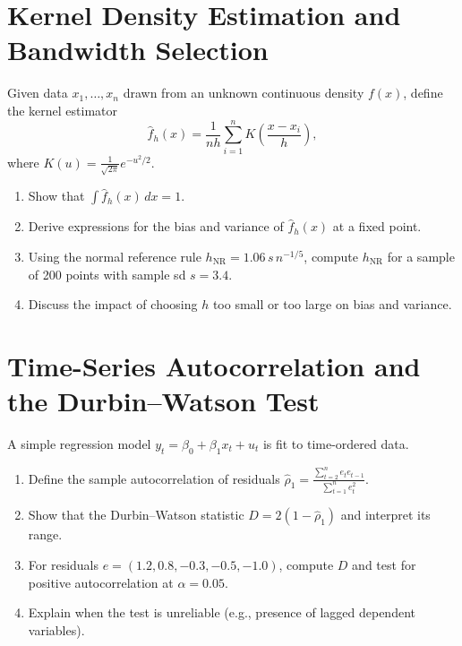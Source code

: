 \documentclass[12pt,a4paper]{article}
\begin{document}
\section{Kernel Density Estimation and Bandwidth Selection}
Given data \( x_1,\ldots,x_n \) drawn from an unknown continuous density \( f(x) \), define the kernel estimator
\[
\hat{f}_h(x) = \frac{1}{nh} \sum_{i=1}^n K\!\left(\frac{x-x_i}{h}\right),
\]
where \( K(u) = \frac{1}{\sqrt{2\pi}} e^{-u^2/2} \).
\begin{enumerate}[label=(\arabic*)]
\item Show that \( \int \hat{f}_h(x)\,dx = 1 \).
\item Derive expressions for the bias and variance of \( \hat{f}_h(x) \) at a fixed point.
\item Using the normal reference rule \( h_{\mathrm{NR}} = 1.06\,s\,n^{-1/5} \), compute \( h_{\mathrm{NR}} \) for a sample of 200 points with sample sd \( s=3.4 \).
\item Discuss the impact of choosing \( h \) too small or too large on bias and variance.
\end{enumerate}

\section{Time-Series Autocorrelation and the Durbin–Watson Test}
A simple regression model \( y_t = \beta_0 + \beta_1 x_t + u_t \) is fit to time-ordered data.
\begin{enumerate}[label=(\arabic*)]
\item Define the sample autocorrelation of residuals \( \hat{\rho}_1 = \frac{\sum_{t=2}^n e_t e_{t-1}}{\sum_{t=1}^n e_t^2} \).
\item Show that the Durbin–Watson statistic \( D = 2(1-\hat{\rho}_1) \) and interpret its range.
\item For residuals \( e = (1.2, 0.8, -0.3, -0.5, -1.0) \), compute \( D \) and test for positive autocorrelation at \( \alpha=0.05 \).
\item Explain when the test is unreliable (e.g., presence of lagged dependent variables).
\end{enumerate}
\end{document}
